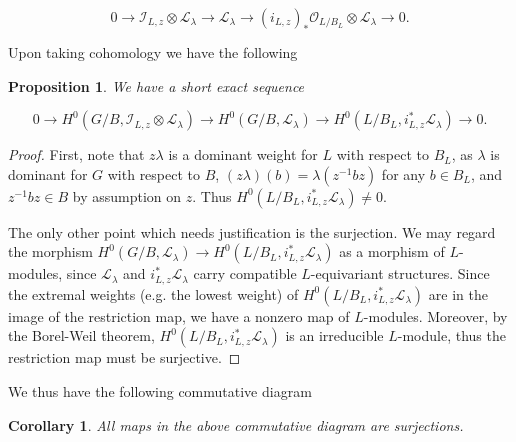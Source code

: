 \documentclass[12pt,reqno]{amsart}
\newtheorem{corollary}[theorem]{Corollary}
\newtheorem{proposition}[theorem]{Proposition}
\theoremstyle{definition}
\begin{document}
\[0 \rightarrow \mathscr{I}_{L,z} \otimes \mathscr{L}_{\lambda} \rightarrow \mathscr{L}_{\lambda} \rightarrow (i_{L,z})_*\mathscr{O}_{L/B_L} \otimes \mathscr{L}_{\lambda} \rightarrow 0.\]

Upon taking cohomology we have the following 

\begin{proposition}
We have a short exact sequence 

\[0 \rightarrow H^0(G/B, \mathscr{I}_{L,z} \otimes \mathscr{L}_{\lambda}) \rightarrow H^0(G/B, \mathscr{L}_{\lambda}) \rightarrow H^0(L/B_L, i_{L,z}^*\mathscr{L}_{\lambda}) \rightarrow 0.\]
\end{proposition}

\begin{proof}
First, note that $z\lambda$ is a dominant weight for $L$ with respect to $B_L$, as $\lambda$ is dominant for $G$ with respect to $B$, $(z\lambda)(b)=\lambda(z^{-1}bz)$ for any $b \in B_L$, and $z^{-1}bz \in B$ by assumption on $z$. Thus $H^0(L/B_L, i^\ast_{L,z} \mathscr{L}_\lambda) \neq 0$. 

The only other point which needs justification is the surjection. We may regard the morphism $H^0(G/B, \mathscr{L}_{\lambda}) \rightarrow H^0(L/B_L, i^*_{L,z} \mathscr{L}_{\lambda} )$ as a morphism of $L$-modules, since $\mathscr{L}_{\lambda}$ and $i^*_{L,z} \mathscr{L}_{\lambda}$ carry compatible $L$-equivariant structures. Since the extremal weights (e.g. the lowest weight) of $H^0(L/B_L, i^*_{L,z} \mathscr{L}_{\lambda})$ are in the image of the restriction map, we have a nonzero map of $L$-modules. Moreover, by the Borel-Weil theorem, $H^0(L/B_L, i^*_{L,z} \mathscr{L}_{\lambda})$ is an irreducible $L$-module, thus the restriction map must be surjective. 
\end{proof}

We thus have the following commutative diagram 

\begin{center}
\end{center}

\begin{corollary} \label{Surj}
All maps in the above commutative diagram are surjections.
\end{corollary}
\end{document}
